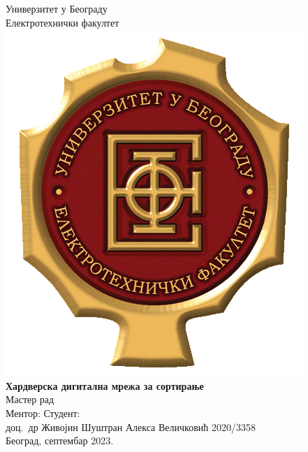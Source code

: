 \documentclass[12pt, a4paper]{article}
\theoremstyle{definition}
\begin{document}
{}

\begin{titlepage}
\vspace{0.5cm}
\center
\Large
Универзитет у Београду\\
Електротехнички факултет\\
\vspace{1.3cm}
\includegraphics[scale=0.27]{slike/etf}\\
\vspace{2.5cm}
\LARGE
\textbf{Хардверска дигитална мрежа за сортирање}\\
\Large
Мастер рад\\
\vfill
\large
\flushleft Ментор: \hfill Студент:\\
\vspace{0.1cm}
доц.\ др Живојин Шуштран \hfill Алекса Величковић 2020/3358\\
\vspace{1.3cm}
\center
Београд, септембар 2023.\\
\vspace{1.3cm}
\end{titlepage}
\end{document}
